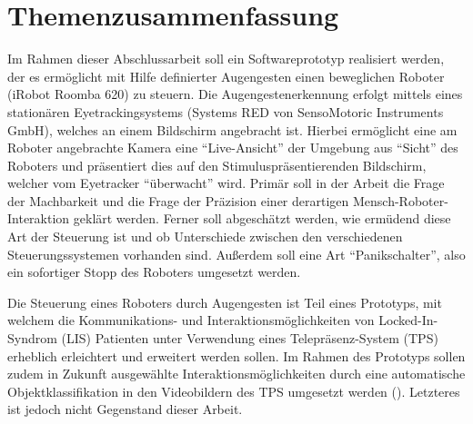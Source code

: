 \documentclass[11pt,a4paper,onecolumn,twoside,ngerman]{book}
\begin{document}
\section*{Themenzusammenfassung}
Im Rahmen dieser Abschlussarbeit soll ein Softwareprototyp realisiert werden, der es ermöglicht mit Hilfe definierter Augengesten einen beweglichen Roboter (iRobot Roomba 620) zu steuern. Die Augengestenerkennung erfolgt mittels eines stationären Eyetrackingsystems (Systems RED von SensoMotoric Instruments GmbH), welches an einem Bildschirm angebracht ist. Hierbei ermöglicht eine am Roboter angebrachte Kamera eine \enquote{Live-Ansicht} der Umgebung aus \enquote{Sicht} des Roboters und präsentiert dies auf den Stimuluspräsentierenden Bildschirm, welcher vom Eyetracker \enquote{überwacht} wird. Primär soll in der Arbeit die Frage der Machbarkeit und die Frage der Präzision einer derartigen Mensch-Roboter-Interaktion geklärt werden. Ferner soll abgeschätzt werden, wie ermüdend diese Art der Steuerung ist und ob Unterschiede zwischen den verschiedenen Steuerungssystemen vorhanden sind. Außerdem soll eine Art \enquote{Panikschalter}, also ein sofortiger Stopp des Roboters umgesetzt werden.
 
Die Steuerung eines Roboters durch Augengesten ist Teil eines Prototyps, mit welchem die Kommunikations- und Interaktionsmöglichkeiten von Locked-In-Syndrom (LIS) Patienten unter Verwendung eines Telepräsenz-System (TPS) erheblich erleichtert und erweitert werden sollen. Im Rahmen des Prototyps sollen zudem in Zukunft ausgewählte Interaktionsmöglichkeiten durch eine automatische Objektklassifikation in den Videobildern des TPS umgesetzt werden (\vgl \cite{Eidam2016}). Letzteres ist jedoch nicht Gegenstand dieser Arbeit. 
 
 
\end{document}
